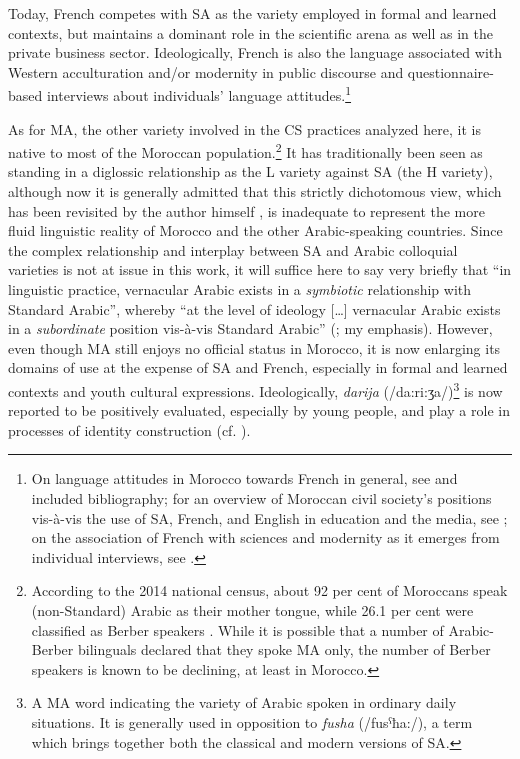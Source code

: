 \documentclass[output=paper]{langscibook}
\begin{document}
Today, French competes with \gls*{SA} as the variety employed in formal and learned contexts, but maintains a dominant role in the scientific arena as well as in the private business sector. Ideologically, French is also the language associated with Western acculturation and/or modernity in public discourse and questionnaire-based interviews about individuals’ language attitudes.\footnote{On language attitudes in Morocco towards French in general, see \citet[193--195]{ennaji_multilingualism_2005} and included bibliography; for an overview of Moroccan civil society’s positions vis-à-vis the use of \gls*{SA}, French, and English in education and the media, see \citet[109--129]{pellegrini_enseignement_2019}; on the association of French with sciences and modernity as it emerges from individual interviews, see \citet{tamer_language_2003,tamer_what_2006, ennaji_multilingualism_2005, boutieri_two_2012, chakrani_work_2014}.} 

As for \gls*{MA}, the other variety involved in the \gls*{CS} practices analyzed here, it is native to most of the Moroccan population.\footnote{According to the 2014 national census, about 92 per cent of Moroccans speak (non-Standard) Arabic as their mother tongue, while 26.1 per cent were classified as Berber speakers \citep{noauthor_rgph_nodate}. While it is possible that a number of Arabic-Berber bilinguals declared that they spoke \gls*{MA} only, the number of Berber speakers is known to be declining, at least in Morocco.} It has traditionally been seen as standing in a diglossic \citep{ferguson_diglossia_1959} relationship as the L variety against \gls*{SA} (the H variety), although now it is generally admitted that this strictly dichotomous view, which has been revisited by the author himself \citep{ferguson_diglossia_1991}, is inadequate to represent the more fluid linguistic reality of Morocco and the other Arabic-speaking countries. Since the complex relationship and interplay between \gls*{SA} and Arabic colloquial varieties is not at issue in this work, it will suffice here to say very briefly that “in linguistic practice, vernacular Arabic exists in a \textit{symbiotic} relationship with Standard Arabic”, whereby “at the level of ideology [\dots] vernacular Arabic exists in a \textit{subordinate} position vis-à-vis Standard Arabic” (\citealt[4]{hachimi_contextualizing_2022}; my emphasis). However, even though \gls*{MA} still enjoys no official status in Morocco, it is now enlarging its domains of use at the expense of \gls*{SA} and French, especially in formal and learned contexts and youth cultural expressions. Ideologically, \textit{darija} (/da:ri:ʒa/)\footnote{A \gls*{MA} word indicating the variety of Arabic spoken in ordinary daily situations. It is generally used in opposition to \textit{fusha} (/fusˁħa:/), a term which brings together both the classical and modern versions of \gls*{SA}.} is now reported to be positively evaluated, especially by young people, and play a role in processes of identity construction (cf. \citealt{de_ruiter_les_2006, de_ruiter_marche_2014, caubet_darija_2017}).
\end{document}
